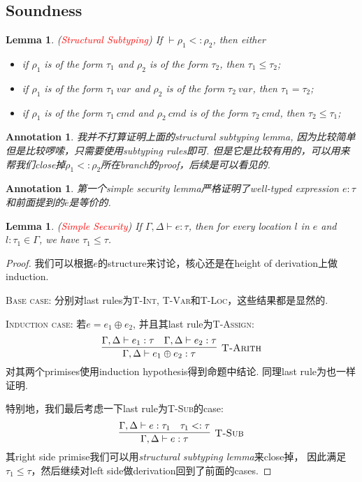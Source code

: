 \documentclass{article}
\newtheorem{lemma}[theorem]{Lemma}
\newtheorem{annotation}[theorem]{Annotation}
\newcommand{\redt}[1]{\textcolor{red}{#1}}
\newcommand{\termtype}[2]{\ensuremath{#1:#2}}
\begin{document}
\subsection{Soundness}

\begin{lemma}
\rm (\redt{Structural Subtyping}) If $\vdash \rho_1 <: \rho_2$, then either
\begin{itemize}
	\item if $\rho_1$ is of the form $\tau_1$ and $\rho_2$ is of the form $\tau_2$, then $\tau_1 \leq \tau_2$;
	\item if $\rho_1$ is of the form $\tau_1~var$ and $\rho_2$ is of the form $\tau_2~var$, then $\tau_1 = \tau_2$;
	\item if $\rho_1$ is of the form $\tau_1~cmd$ and $\rho_2~cmd$ is of the form $\tau_2~cmd$, then $\tau_2 \leq \tau_1$;
\end{itemize}
\end{lemma}

\begin{annotation}
\rm 我并不打算证明上面的\emph{structural subtyping lemma}, 因为比较简单但是比较啰嗦，只需要使用subtyping rules即可. 但是它是比较有用的，可以用来帮我们close掉$\rho_1 <: \rho_2$所在branch的proof，后续是可以看见的.
\end{annotation}

\begin{annotation}
\rm 第一个\emph{simple security lemma}严格证明了well-typed expression $\termtype{e}{\tau}$和前面提到的$\overline{e}$是等价的. 
\end{annotation}

\begin{lemma}
\rm (\redt{Simple Security}) If $\Gamma,\Delta \vdash \termtype{e}{\tau}$, then for every location $l$ in $e$ and $\termtype{l}{\tau_1} \in \Gamma$, we have $\tau_1 \leq \tau$. 
\end{lemma}

\begin{proof}
\rm 我们可以根据$e$的structure来讨论，核心还是在height of derivation上做induction. 

\textsc{Base case}: 分别对last rules为\textsc{T-Int}, \textsc{T-Var}和\textsc{T-Loc}，这些结果都是显然的.

\textsc{Induction case}: 若$e = e_1 \oplus e_2$, 并且其last rule为\textsc{T-Assign}:
\[
	\infer[\textsc{T-Arith}]{\Gamma, \Delta \vdash \termtype{e_1 \oplus e_2}{\tau}}{\Gamma, \Delta \vdash \termtype{e_1}{\tau} & \Gamma, \Delta \vdash \termtype{e_2}{\tau}}
\]
对其两个primises使用induction hypothesis得到命题中结论. 同理last rule为也一样证明. 

特别地，我们最后考虑一下last rule为\textsc{T-Sub}的case:
\[
	\infer[\textsc{T-Sub}]{\Gamma, \Delta \vdash \termtype{e}{\tau}}{\Gamma, \Delta \vdash \termtype{e}{\tau_1} & \tau_1 <: \tau}
\]
其right side primise我们可以用\emph{structural subtyping lemma}来close掉， 因此满足$\tau_1 \leq \tau$，然后继续对left side做derivation回到了前面的cases.
\end{proof}
\end{document}
